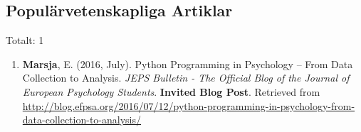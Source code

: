 \documentclass[]{article}
\providecommand{\tightlist}{%
  \setlength{\itemsep}{0pt}\setlength{\parskip}{0pt}}
\begin{document}
\hypertarget{populuxe4rvetenskapliga-artiklar}{%
\subsection{Populärvetenskapliga
Artiklar}\label{populuxe4rvetenskapliga-artiklar}}

Totalt: 1

\begin{enumerate}
\def\labelenumi{\arabic{enumi}.}
\tightlist
\item
  \textbf{Marsja}, E. (2016, July). Python Programming in Psychology --
  From Data Collection to Analysis. \emph{JEPS Bulletin - The Official
  Blog of the Journal of European Psychology Students}. \textbf{Invited
  Blog Post}. Retrieved from \sloppy
  \url{http://blog.efpsa.org/2016/07/12/python-programming-in-psychology-from-data-collection-to-analysis/}
\end{enumerate}
\end{document}
